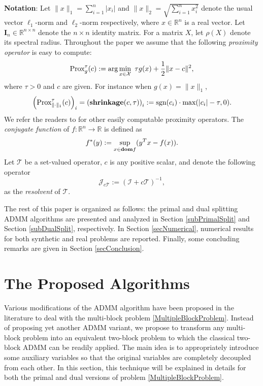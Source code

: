 \documentclass{mcom-l}
\theoremstyle{definition}
\theoremstyle{remark}
\numberwithin{equation}{section}
\begin{document}
{\bf{Notation}}: Let $\| x \|_1 = \sum_{i=1}^n |x_i|$ and $\|x\|_2 = \sqrt{\sum_{i=1}^n x_i^2}$ denote the usual vector $\ell_1$-norm and $\ell_2$-norm respectively, where $x\in\mathbb{R}^n$ is a real vector. Let $\mathbf{I}_n\in\mathbb{R}^{n\times n}$ denote the $n\times n$ identity matrix. For a matrix $X$, let $\rho(X)$ denote its spectral radius. Throughout the paper we assume that the following {\em{proximity operator}} is easy to compute:
\begin{equation}\label{Proximal1}
\hbox{Prox}_{ g}^{\tau} (c): = \arg \min_{x\in {\mathcal{X}}}\ \tau g
(x) + \frac{1}{2}\| x - c \|^2,
\end{equation}
where $\tau>0$ and $c$ are given. For instance when $g(x) = \|x\|_1$,
\begin{equation}\label{Proximal2}
\left(\hbox{Prox}_{ \|\cdot\|_1}^{\tau} (c)\right)_i =
\left({\bf{shrinkage}}(c,\tau)\right)_i :=
\hbox{sgn}(c_i)\cdot\hbox{max}(|c_i| - \tau,0).
\end{equation}
We refer the readers to \cite{Combettes2011,Ma2012} for other easily computable proximity operators. The {\em{conjugate function}} of $f:\mathbb{R}^n\rightarrow \mathbb{R}$ is defined as
\begin{equation}\label{Conjugate}
f^* (y) := \sup_{x\in {\bf{dom}}f} (y^T x - f(x)).
\end{equation}
Let ${\mathcal{T}}$ be a set-valued operator, $c$ is any positive scalar, and denote the following operator
\begin{equation}\label{resolvent}
{\mathcal{J}}_{c{\mathcal{T}}}:= ({\mathcal{I}} + c {\mathcal{T}})^{-1},
\end{equation}
as the {\em{resolvent}} of ${\mathcal{T}}$.

The rest of this paper is organized as follows: the primal and dual splitting ADMM algorithms are presented and analyzed in Section \ref{subPrimalSplit} and Section \ref{subDualSplit}, respectively. In Section \ref{secNumerical}, numerical results for both synthetic and real problems are reported. Finally, some concluding remarks are given in Section \ref{secConclusion}.

\setcounter{equation}{0}
\section{The Proposed Algorithms}\label{secSplit}

Various modifications of the ADMM algorithm have been proposed in the literature
to deal with the multi-block problem \eqref{MultipleBlockProblem}.
Instead of proposing yet another ADMM variant, we propose to transform
any multi-block problem into an equivalent two-block
problem to which the classical two-block ADMM can be readily
applied. The main idea is to appropriately introduce some auxiliary
variables so that the original variables are completely decoupled
from each other. In this section, this technique will be explained
in details for both the primal and dual versions of problem
\eqref{MultipleBlockProblem}.
\end{document}
